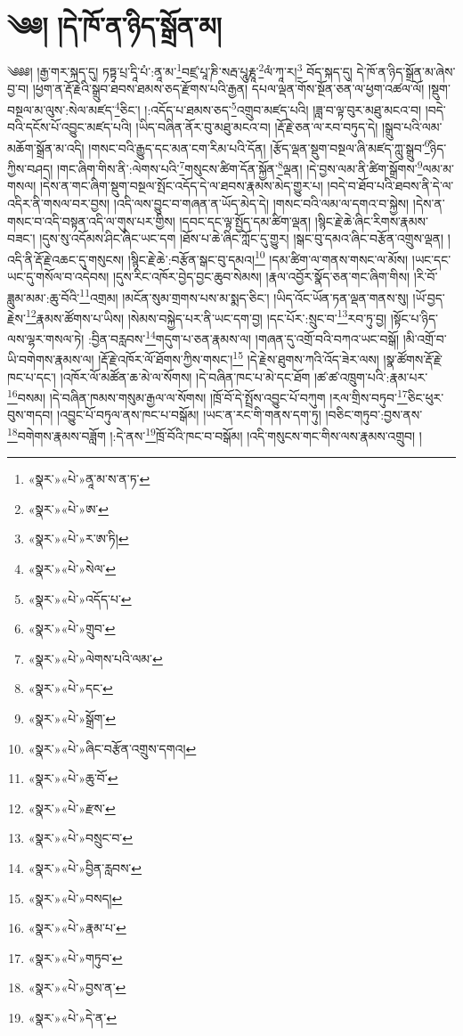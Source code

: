 \chapter{༄༅། །དེ་ཁོ་ན་ཉིད་སྒྲོན་མ།}༄༅༅། །རྒྱ་གར་སྐད་དུ། ཏཏྟྭ་པྲ་དཱི་པཾ་:ནཱ་མ་\footnote{«སྣར་»«པེ་»ནཱ་མ་ས་ན་ཏ་}བཛྲ་པཱ་ཎི་སརྦ་པཱུརྞཱ་\footnote{«སྣར་»«པེ་»ཨ་}ལཾ་ཀཱ་ར།\footnote{«སྣར་»«པེ་»ར་ཨ་ཏི།} བོད་སྐད་དུ། དེ་ཁོ་ན་ཉིད་སྒྲོན་མ་ཞེས་བྱ་བ། །ཕྱག་ན་རྡོ་རྗེའི་སྒྲུབ་ཐབས་ཐམས་ཅད་རྫོགས་པའི་རྒྱན། དཔལ་ལྡན་གོས་སྔོན་ཅན་ལ་ཕྱག་འཚལ་ལོ། །སྡུག་བསྔལ་མ་ལུས་:སེལ་མཛད་\footnote{«སྣར་»«པེ་»སེལ་}ཅིང་། །:འདོད་པ་ཐམས་ཅད་\footnote{«སྣར་»«པེ་»འདོད་པ་}འགྲུབ་མཛད་པའི། །ཟླ་བ་ལྟ་བུར་མཐུ་མངའ་བ། །བདེ་བའི་དངོས་པོ་འབྱུང་མཛད་པའི། །ཡིད་བཞིན་ནོར་བུ་མཐུ་མངའ་བ། །རྡོ་རྗེ་ཅན་ལ་རབ་བཏུད་དེ། །སྒྲུབ་པའི་ལམ་མཆོག་སྒྲོན་མ་འདི། །གསང་བའི་རྒྱུད་དང་མན་ངག་རིམ་པའི་དོན། །རྩོད་ལྡན་སྡུག་བསྔལ་ཞི་མཛད་ཀླུ་སྒྲུབ་\footnote{«སྣར་»«པེ་»གྲུབ་}ཉིད་ཀྱིས་བཤད། །གང་ཞིག་གིས་ནི་:ལེགས་པའི་\footnote{«སྣར་»«པེ་»ལེགས་པའི་ལམ་}གསུངས་ཚིག་དོན་སྐྱོན་\footnote{«སྣར་»«པེ་»དང་}ལྡན། །དེ་བྱས་ལམ་ནི་ཚིག་སྒྲོགས་\footnote{«སྣར་»«པེ་»སྒྲོག་}ལམ་མ་གསལ། །དེས་ན་གང་ཞིག་སྡུག་བསྔལ་སྤོང་འདོད་དེ་ལ་ཐབས་རྣམས་མེད་གྱུར་པ། །བདེ་བ་ཐོབ་པའི་ཐབས་ནི་དེ་ལ་འདིར་ནི་གསལ་བར་བྱས། །འདི་ལས་བྱུང་བ་གཞན་ན་ཡོད་མེད་དེ། །གསང་བའི་ལམ་ལ་དགའ་བ་སྐྱེས། །དེས་ན་གསང་བ་འདི་བསྟན་འདི་ལ་གུས་པར་གྱིས། །དབང་དང་ལྟ་སྤྱོད་དམ་ཚིག་ལྡན། །སྙིང་རྗེ་ཆེ་ཞིང་རིགས་རྣམས་བཟང་། །དུས་སུ་འདོམས་ཤིང་ཞིང་ཡང་དག །ཐོས་པ་ཆེ་ཞིང་ཀློང་དུ་གྱུར། །སྒང་བུ་དམའ་ཞིང་བརྩོན་འགྲུས་ལྡན། །འདི་ནི་རྡོ་རྗེ་འཆང་དུ་གསུངས། །སྙིང་རྗེ་ཆེ་:བརྩོན་སྒང་བུ་དམའ།\footnote{«སྣར་»«པེ་»ཞིང་བརྩོན་འགྲུས་དགའ།} །དམ་ཚིག་ལ་གནས་གསང་ལ་མོས། །ཡང་དང་ཡང་དུ་གསོལ་བ་འདེབས། །དུས་རིང་འཁོར་བྱེད་བྱང་ཆུབ་སེམས། །རྣལ་འབྱོར་སྣོད་ཅན་གང་ཞིག་གིས། །རི་བོ་ཟླུམ་མམ་:ཆུ་བོའི་\footnote{«སྣར་»«པེ་»ཆུ་བོ་}འགྲམ། །མངོན་སུམ་གྲགས་པས་མ་སྨད་ཅིང་། །ཡིད་འོང་ཡོན་ཏན་ལྡན་གནས་སུ། །ཡོ་བྱད་རྗེས་\footnote{«སྣར་»«པེ་»རྫས་}རྣམས་ཚོགས་པ་ཡིས། །སེམས་བསྐྱེད་པར་ནི་ཡང་དག་བྱ། །དང་པོར་:སྲུང་བ་\footnote{«སྣར་»«པེ་»བསྲུང་བ་}རབ་ཏུ་བྱ། །སྟོང་པ་ཉིད་ལས་ལྷར་གསལ་ཏེ། :བྱིན་བརླབས་\footnote{«སྣར་»«པེ་»བྱིན་རླབས་}གདུག་པ་ཅན་རྣམས་ལ། །གཞན་དུ་འགྲོ་བའི་བཀའ་ཡང་བསྒོ། །མི་འགྲོ་བ་ཡི་བགེགས་རྣམས་ལ། །རྡོ་རྗེ་འཁོར་ལོ་ཐོགས་ཀྱིས་གསང་།\footnote{«སྣར་»«པེ་»བསད།} །དེ་རྗེས་ཐུགས་ཀའི་འོད་ཟེར་ལས། །སྣ་ཚོགས་རྡོ་རྗེ་ཁང་པ་དང་། །འཁོར་ལོ་མཚོན་ཆ་མེ་ལ་སོགས། །དེ་བཞིན་ཁང་པ་མེ་དང་ཐོག །ཚ་ཚ་འཁྲུག་པའི་:རྣམ་པར་\footnote{«སྣར་»«པེ་»རྣམ་པ་}བསམ། །དེ་བཞིན་ཁམས་གསུམ་རྒྱལ་ལ་སོགས། །ཁྲོ་བོ་དེ་སྤྲོས་འབྱུང་པོ་བཀུག །རལ་གྲིས་བཏུབ་\footnote{«སྣར་»«པེ་»གཏུབ་}ཅིང་ཕུར་བུས་གདབ། །འབྱུང་པོ་བཏུལ་ནས་ཁང་པ་བསྒོམ། །ཡང་ན་རང་གི་གནས་དག་ཏུ། །བཅིང་གཏུབ་:བྱས་ནས་\footnote{«སྣར་»«པེ་»བྱས་ན་}བགེགས་རྣམས་བཟློག །:དེ་ནས་\footnote{«སྣར་»«པེ་»དེ་ན་}ཁྲོ་བོའི་ཁང་བ་བསྒོམ། །འདི་གསུངས་གང་གིས་ལས་རྣམས་འགྲུབ། །
